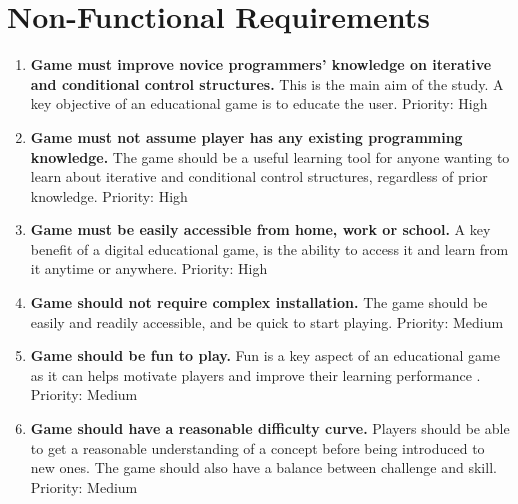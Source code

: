 \documentclass[a4paper,11.5pt]{report}
\numberwithin{figure}{section}
\numberwithin{table}{section}
\numberwithin{equation}{section}
\numberwithin{equation}{section}
\begin{document}





\section{Non-Functional Requirements}

\begin{enumerate}[label=3.1.\arabic*]

  \item \textbf{Game must improve novice programmers' knowledge on iterative and conditional control structures.} This is the main aim of the study. A key objective of an educational game is to educate the user. \newline Priority: High
  
  \item \textbf{Game must not assume player has any existing programming knowledge.} The game should be a useful learning tool for anyone wanting to learn about iterative and conditional control structures, regardless of prior knowledge. \newline Priority: High

  \item \textbf{Game must be easily accessible from home, work or school.} A key benefit of a digital educational game, is the ability to access it and learn from it anytime or anywhere. \newline Priority: High
  
  \item \textbf{Game should not require complex installation.} The game should be easily and readily accessible, and be quick to start playing. \newline Priority: Medium
  
  \item \textbf{Game should be fun to play.} Fun is a key aspect of an educational game as it can helps motivate players \citep{Cordova1996} and improve their learning performance \citep{giannakos2013}. \newline Priority: Medium
  
  \item \textbf{Game should have a reasonable difficulty curve.} Players should be able to get a reasonable understanding of a concept before being introduced to new ones. The game should also have a balance between challenge and skill. \newline Priority: Medium
  

\end{enumerate}
\end{document}

